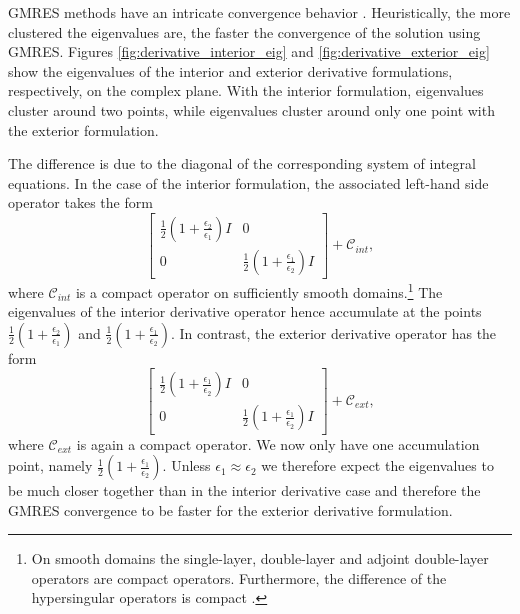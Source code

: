 GMRES methods have an intricate convergence behavior \cite{mark1999a}.
Heuristically, the more clustered the eigenvalues are, the faster the convergence of the solution using GMRES.
Figures \ref{fig:derivative_interior_eig} and \ref{fig:derivative_exterior_eig} show the eigenvalues of the interior and exterior derivative formulations, respectively, on the complex plane.
With the interior formulation, eigenvalues cluster around two points, while eigenvalues cluster around only one point with the exterior formulation.

The difference is due to the diagonal of the corresponding system of integral equations.
In the case of the interior formulation, the associated left-hand side operator takes the form
$$
\begin{bmatrix}\frac{1}{2}(1 + \frac{\epsilon_2}{\epsilon_1})I & 0 \\ 0 & \frac{1}{2}(1 + \frac{\epsilon_1}{\epsilon_2})I
\end{bmatrix} + \mathcal{C}_{int},
$$
where $\mathcal{C}_{int}$ is a compact operator on sufficiently smooth domains.\footnote{On smooth domains the single-layer, double-layer and adjoint double-layer operators are compact operators.
Furthermore, the difference of the hypersingular operators is compact \cite{Hiptmair2006-om}.}
The eigenvalues of the interior derivative operator hence accumulate at the points $\frac{1}{2}(1 + \frac{\epsilon_2}{\epsilon_1})$ and $\frac{1}{2}(1 + \frac{\epsilon_1}{\epsilon_2})$.
In contrast, the exterior derivative operator has the form
$$
\begin{bmatrix}\frac{1}{2}(1 + \frac{\epsilon_1}{\epsilon_2})I & 0 \\ 0 & \frac{1}{2}(1 + \frac{\epsilon_1}{\epsilon_2})I
\end{bmatrix} + \mathcal{C}_{ext},
$$
where $\mathcal{C}_{ext}$ is again a compact operator.
We now only have one accumulation point, namely $\frac{1}{2}(1 + \frac{\epsilon_1}{\epsilon_2})$.
Unless $\epsilon_1\approx \epsilon_2$ we therefore expect the eigenvalues to be much closer together than in the interior derivative case and therefore the GMRES convergence to be faster for the exterior derivative formulation.

